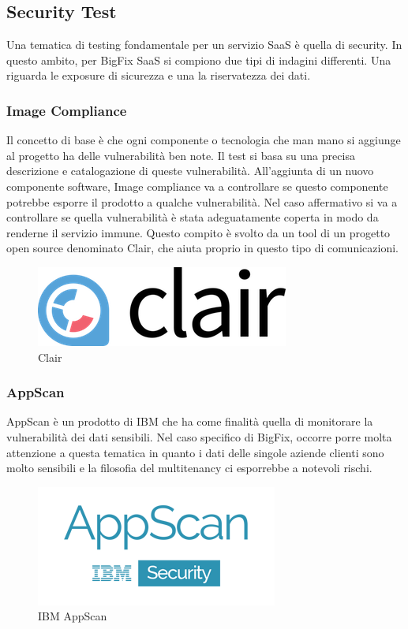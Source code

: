 \subsection{Security Test}
Una tematica di testing fondamentale per un servizio SaaS è quella di security. In questo ambito, per BigFix SaaS si compiono due tipi di indagini differenti. Una riguarda le exposure di sicurezza e una la riservatezza dei dati.
\subsubsection{Image Compliance}
Il concetto di base è che ogni componente o tecnologia che man mano si aggiunge al progetto ha delle vulnerabilità ben note. Il test si basa su una precisa descrizione e catalogazione di queste vulnerabilità. All'aggiunta di un nuovo componente software, Image compliance va a controllare se questo componente potrebbe esporre il prodotto a qualche vulnerabilità. Nel caso affermativo si va a controllare se quella vulnerabilità è stata adeguatamente coperta in modo da renderne il servizio immune. Questo compito è svolto da un tool di un progetto open source denominato Clair, che aiuta proprio in questo tipo di comunicazioni.
\begin{figure}[h]
	\centering
	\includegraphics[width=0.5\linewidth]{capitoli/imgs/clair}
	\caption{Clair}
	\label{fig:clair}
\end{figure}
\subsubsection{AppScan}
AppScan è un prodotto di IBM che ha come finalità quella di monitorare la vulnerabilità dei dati sensibili. Nel caso specifico di BigFix, occorre porre molta attenzione a questa tematica in quanto i dati delle singole aziende clienti sono molto sensibili e la filosofia del multitenancy ci esporrebbe a notevoli rischi. 
\begin{figure}[h]
	\centering
	\includegraphics[width=0.5\linewidth]{capitoli/imgs/ibm-appscan-logo}
	\caption{IBM AppScan}
	\label{fig:ibm-appscan-logo}
\end{figure}

